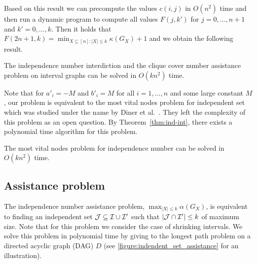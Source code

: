 Based on this result we can precompute the values $c(i,j)$ in $O(n^2)$ time and 
then run a dynamic program to compute all values $F(j,k')$ for $j=0,\dots,n+1$ and 
$k'=0,\dots,k$. Then it holds that $F(2n+1,k) = \min_{X \subseteq [n] \colon |X| \leq k} \kappa(G_X) + 1$
and we obtain the following result.

\begin{theorem}\label{thm:ind-int}
    The independence number interdiction and the clique cover number assistance problem on interval graphs can be solved in $O(k n^2)$ time.
\end{theorem}

Note that for $a'_i = -M$ and $b'_i = M$ for all $i=1,\dots,n$ and some large constant $M$, our 
problem is equivalent to the most vital nodes problem for independent set which was studied 
under the name 
by Diner et al.~\cite{diner2018contractionDeletionBlockers}. They left the complexity 
of this problem as an open question. By Theorem~\ref{thm:ind-int}, there exists 
a polynomial time algorithm for this problem.
\begin{corollary}
    The most vital nodes problem for independence number  can be solved in $O(k n^2)$ time.
\end{corollary}

\subsection{Assistance problem}
\label{subsec:ind-assistance}

The independence number assistance problem, $\max_{|X| \leq k} \alpha(G_X)$,
is equivalent to finding an independent set $\mathcal{J} \subseteq \mathcal{I} \cup \mathcal{I}'$ such that 
$ |\mathcal{J} \cap \mathcal{I}'| \leq k$ of maximum size. Note that for this problem we consider the 
case of shrinking intervals. We solve this problem in 
polynomial time by giving  to the longest path problem on a directed acyclic graph (DAG) $D$
(see \cref{figure:indendent_set_assistance} for an illustration).

